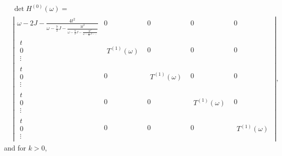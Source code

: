 \documentclass{article}
\begin{document}
\begin{equation}
\begin{split}
    &\det H^{(0)}(\omega) = \\ 
    &\left\vert
    \begin{array}{c|c|c|c|c}
        \omega - 2J - \frac{4t^2}{
            \omega - \frac{7}{2}J - \frac{3t^2}{
                \omega - \frac{9}{2}J - \frac{3t^2}{
                    \omega - \frac{11}{2}J - \hdots
                }
            }
        } & 
            0 & 0 & 0 & 0 \\
        \hline
        \begin{array}{c} t \\ 0 \\ \vdots \end{array} & 
            \begin{array}{c} T^{(1)}(\omega) \end{array} & 0 & 0 & 0 \\
        \hline
        \begin{array}{c} t \\ 0 \\ \vdots \end{array} & 
            0 & \begin{array}{c} T^{(1)}(\omega) \end{array} & 0 & 0 \\
        \hline
        \begin{array}{c} t \\ 0 \\ \vdots \end{array} & 
            0 & 0 &\begin{array}{c} T^{(1)}(\omega) \end{array} & 0 \\
        \hline
        \begin{array}{c} t \\ 0 \\ \vdots \end{array} & 
            0 & 0 & 0 & \begin{array}{c} T^{(1)}(\omega) \end{array}
    \end{array}
    \right\vert,
\end{split}
\end{equation}
and for $k > 0$,
\end{document}
